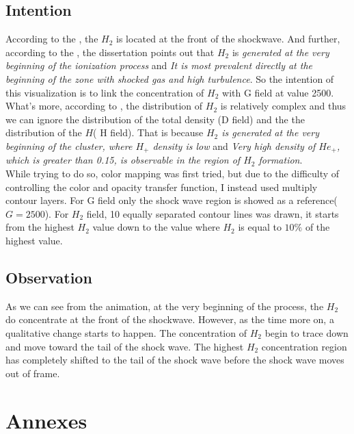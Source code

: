 \documentclass[11pt]{scrartcl}
\begin{document}
\subsection{Intention}
According to the \cite[s.~2]{sum2}, the $H_2$ is located at the front of the shockwave. And further, according to the \cite[s.~2,~4]{sum1}, the dissertation points out that $H_2$ is \textit{generated at the very beginning of the ionization process} and \textit{It is most prevalent directly at the beginning of the zone with shocked gas and high turbulence}. So the intention of this visualization is to link the concentration of $H_2$ with G field at value 2500. \\

What's more, according to \cite[s.~4]{sum1}, the distribution of $H_2$ is relatively complex and thus we can ignore the distribution of the total density (D field) and the the distribution of the $H$( H field). That is because \textit{$H_2$ is generated at the very beginning of the cluster, where $H_+$ density is low} and \textit{Very high density of $He_+$, which is greater than 0.15, is observable in the region of $H_2$ formation}.\\

While trying to do so, color mapping was first tried, but due to the difficulty of controlling the color and opacity transfer function, I instead used multiply contour layers. For G field only the shock wave region is showed as a reference($G=2500$). For $H_2$ field, 10 equally separated contour lines was drawn, it starts from the highest $H_2$ value down to the value where $H_2$ is equal to $10\%$ of the highest value.


\subsection{Observation}

As we can see from the animation, at the very beginning of the process, the $H_2$ do concentrate at the front of the shockwave. However, as the time more on, a qualitative change starts to happen. The concentration of $H_2$ begin to trace down and move toward the tail of the shock wave. The highest $H_2$ concentration region has completely shifted to the tail of the shock wave before the shock wave moves out of frame.
\section{Annexes}
\end{document}
